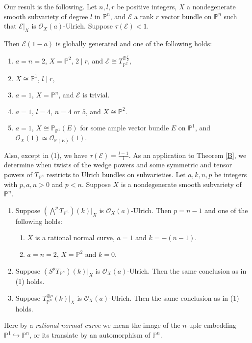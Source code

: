 \documentclass[11pt,letterpaper]{amsart}
\newenvironment{manualtheorem}[1]{%
  \renewcommand\themanualtheoreminner{#1}%
  \manualtheoreminner
}{\endmanualtheoreminner}
\begin{document}
 Our result is the following.
\begin{manualtheorem}{B}\label{B}
    Let $n,l,r$ be positive integers, $X$ a nondegenerate smooth
subvariety of degree $l$ in $\mathbb{P}^n$, and
$\mathcal{E}$ a rank $r$ vector bundle on $\mathbb{P}^n$ such that
$\mathcal{E}|_X$ is $\mathcal{O}_X(a)$-Ulrich. Suppose $\tau(\mathcal{E})<1.$

Then $\mathcal{E}(1-a)$ is globally generated and one of the following
holds:

\begin{enumerate}
\item $a=n=2$, $X= \mathbb{P}^2$, $2\mid r$, and $\mathcal{E}\cong T_{\mathbb{P}^2}^{\oplus \frac r2},$

\item $X\cong \mathbb{P}^1$, $l\mid r$,
\item $a=1$, $X=\mathbb{P}^n$, and $\mathcal{E}$ is trivial.

\item $a=1$, $l=4$, $n=4$ or $5$, and $X\cong \mathbb{P}^2.$

\item $a=1$, $X\cong \mathbb{P}_{\mathbb{P}^1}(E)$
for some ample vector bundle $E$ on $\mathbb{P}^1$, and $\mathcal{O}_X(1)\simeq
\mathcal{O}_{\mathbb{P}(E)}(1).$
\end{enumerate}

Also, except in (1), we have $\tau(\mathcal{E})=\frac{l-1}{l}.$
\end{manualtheorem}
As an application to Theorem \ref{B}, we determine when twists of the wedge powers and some symmetric and tensor powers of $T_{\mathbb{P}^n}$ restricts to Ulrich bundles on subvarieties.
\begin{manualtheorem}{C}\label{C}
    Let $a,k,n,p$ be integers with $p,a,n>0$ and $p<n$.
Suppose $X$ is a nondegenerate smooth subvariety of $\mathbb{P}^n$.

\begin{enumerate}
\item Suppose $\left(\bigwedge^p T_{\mathbb{P}^n}\right)(k)\big|_X$
is $\mathcal{O}_X(a)$-Ulrich. Then $p=n-1$ and one of the following holds:

\begin{enumerate}
\item $X$ is a rational normal curve, $a=1$ and $k=-(n-1)$.

\item $a=n=2$, $X=\mathbb{P}^2$ and $k=0$.
\end{enumerate}
\item Suppose $\left(S^p T_{\mathbb{P}^n}\right)(k)\big|_X$
is $\mathcal{O}_X(a)$-Ulrich. Then the same conclusion as in (1) holds.
\item Suppose $T_{\mathbb{P}^n}^{\otimes p}(k)\big|_X$
is $\mathcal{O}_X(a)$-Ulrich. Then the same conclusion as in (1) holds.
\end{enumerate}
\end{manualtheorem}
Here by a \textit{rational normal curve} we mean the image of the $n$-uple embedding $\mathbb{P}^1\hookrightarrow \mathbb{P}^n$, or its translate by an automorphism of $\mathbb{P}^n.$
\end{document}
